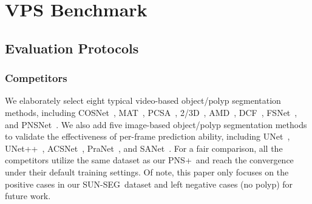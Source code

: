 \documentclass[default,iicol]{sn-jnl}
\theoremstyle{thmstyleone}
\theoremstyle{thmstyletwo}
\theoremstyle{thmstylethree}
\def\ourmodel{PNS+}
\def\ourdataset{SUN-SEG}
\begin{document}
\section{VPS Benchmark}\label{sec:vps_benchmark}

\subsection{Evaluation Protocols}\label{sec:evaluation_protocols}

\subsubsection{Competitors} 
We elaborately select eight typical video-based object/polyp segmentation methods, including COSNet~\cite{lu2019see}, MAT~\cite{zhou2020matnet}, PCSA~\cite{gu2020pyramid}, 2/3D~\cite{puyal2020endoscopic}, AMD~\cite{liu2021emergence}, DCF~\cite{zhang2021dynamic}, FSNet~\cite{ji2021full}, and PNSNet~\cite{ji2021pnsnet}.
We also add five image-based object/polyp segmentation methods to validate the effectiveness of per-frame prediction ability, including UNet~\cite{ronneberger2015u}, UNet++~\cite{zhou2018unetplus}, ACSNet~\cite{zhang2020adaptive}, PraNet~\cite{fan2020pra}, and SANet~\cite{wei2021shallow}.
For a fair comparison, all the competitors utilize the same dataset as our \ourmodel~and reach the convergence under their default training settings.
Of note, this paper only focuses on the positive cases in our \ourdataset~dataset and left negative cases (no polyp) for future work.
\end{document}
